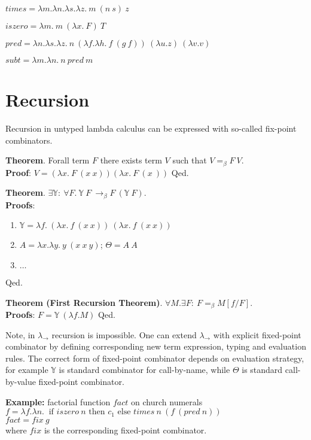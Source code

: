 \documentclass[9pt]{article}
\begin{document}
$times = \lambda m .\lambda n . \lambda s . \lambda z.\ m\ (n\ s)\ z$

$iszero = \lambda m .\ m\ (\lambda x.\ F)\ T$

$pred = \lambda n. \lambda s. \lambda z.\ n\ (\lambda f. \lambda h.\ f\ (g\ f))\ (\lambda u. z)\ (\lambda v. v)$

$subt = \lambda m .\lambda n .\ n\ pred\ m$

\section{Recursion}

Recursion in untyped lambda calculus can be expressed with so-called fix-point combinators.

\noindent\textbf{Theorem}.
Forall term $F$ there exists term $V$ such that $V =_{\beta} F\ V$.\\
\textbf{Proof}: $V=(\lambda x.\ F\ (x\ x))(\lambda x.\ F\ (x\ ))$ Qed.

\noindent\textbf{Theorem}.
$\exists \mathbb{Y}:\ \forall F.\ \mathbb{Y}\ F\ \to_{\beta} F\ (\mathbb{Y}\ F)$.\\
\textbf{Proofs}: \\
\begin{enumerate}
    \item $\mathbb{Y} = \lambda f.\ (\lambda x.\ f\ (x\ x))\ (\lambda x.\ f\ (x\ x))$
    \item $A = \lambda x. \lambda y.\ y\ (x\ x\ y)$; $\Theta = A\ A$
    \item $\dots$
\end{enumerate}
Qed.

\noindent\textbf{Theorem (First Recursion Theorem)}.
$\forall M. \exists F:\ F =_{\beta} M[f/F]$.\\
\textbf{Proofs}: $F = \mathbb{Y}\ (\lambda f. M)$ Qed.

Note, in $\lambda_{\to}$ recursion is impossible.
One can extend $\lambda_{\to}$ with explicit fixed-point combinator by defining corresponding new term expression, typing and evaluation rules.
The correct form of fixed-point combinator depends on evaluation strategy,
for example $\mathbb{Y}$ is standard combinator for call-by-name, while
$\Theta$ is standard call-by-value fixed-point combinator.

\noindent\textbf{Example:} factorial function $fact$ on church numerals\\
$f = \lambda f. \lambda n.\ \text{ if } iszero\ n \text{ then } c_1 \text{ else } times\ n\ (f\ (pred\ n))$\\
$fact = fix\ g$\\
where $fix$ is the corresponding fixed-point combinator.
\end{document}
